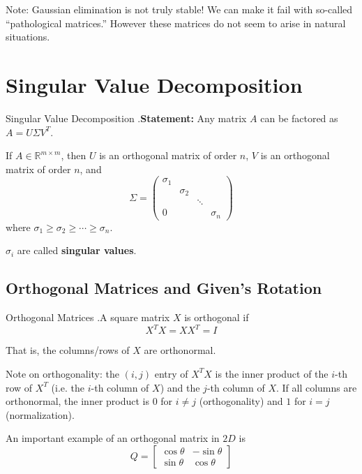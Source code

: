 \documentclass[12pt,letterpaper]{article}
\newcommand{\skipline}{\vspace{\baselineskip}}
\newcommand{\R}{\mathbb{R}}
\begin{document}
Note: Gaussian elimination is not truly stable! We can make it fail with so-called ``pathological matrices.'' However these matrices do not seem to arise in natural situations.


\section{Singular Value Decomposition}

\begin{constr}{Singular Value Decomposition}
.\textbf{Statement:} Any matrix $A$ can be factored as $A = U \Sigma V^T$.
\medskip

If $A \in \R^{m \times m}$, then $U$ is an orthogonal matrix of order $n$, $V$ is an orthogonal matrix of order $n$, and
\begin{equation}
\Sigma = \begin{pmatrix}
	\sigma_1 \\
	& \sigma_2 \\
	& & \ddots \\
	0 & & & \sigma_n
\end{pmatrix}
\end{equation}
where $\sigma_1 \geq \sigma_2 \geq \cdots \geq \sigma_n$.
\medskip

$\sigma_i$ are called \textbf{singular values}.
\label{constr:svd}
\end{constr}

\subsection{Orthogonal Matrices and Given's Rotation}

\begin{defn}{Orthogonal Matrices}
.A square matrix $X$ is orthogonal if
\begin{equation}
	X^T X = X X^T = I
\end{equation}

That is, the columns/rows of $X$ are orthonormal.
\label{def:ortho}
\end{defn}

Note on orthogonality: the $(i,j)$ entry of $X^T X$ is the inner product of the $i$-th row of $X^T$ (i.e. the $i$-th column of $X$) and the $j$-th column of $X$. If all columns are orthonormal, the inner product is $0$ for $i \neq j$ (orthogonality) and $1$ for $i=j$ (normalization).

\skipline

An important example of an orthogonal matrix in $2D$ is
\begin{equation}
Q =
\begin{bmatrix}
	\cos \theta & -\sin \theta \\
	\sin \theta & \cos \theta
\end{bmatrix}
\end{equation}
\end{document}
